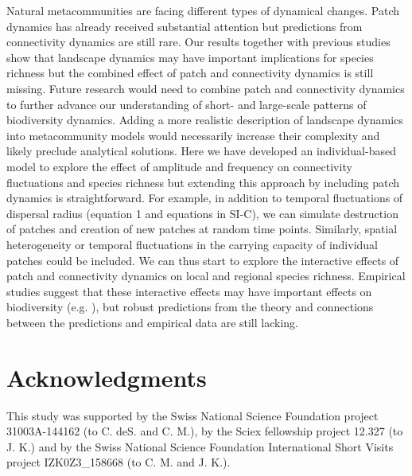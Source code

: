 \documentclass[12pt]{article}
\begin{document}
Natural metacommunities are facing different types of dynamical changes. Patch dynamics has already received substantial attention but predictions from connectivity dynamics are still rare. Our results together with previous studies show that landscape dynamics may have important implications for species richness but the combined effect of patch and connectivity dynamics is still missing. Future research would need to combine patch and connectivity dynamics to further advance our understanding of short- and large-scale patterns of biodiversity dynamics. Adding a more realistic description of landscape dynamics into metacommunity models would necessarily increase their complexity and likely preclude analytical solutions. Here we have developed an individual-based model to explore the effect of amplitude and frequency on connectivity fluctuations and species richness but extending this approach by including patch dynamics is straightforward. For example, in addition to temporal fluctuations of dispersal radius (equation 1 and equations in SI-C), we can simulate destruction of patches and creation of new patches at random time points. Similarly, spatial heterogeneity or temporal fluctuations in the carrying capacity of individual patches could be included. We can thus start to explore the interactive effects of patch and connectivity dynamics on local and regional species richness. Empirical studies suggest that these interactive effects may have important effects on biodiversity (e.g. \cite{LauranceEtAl1997, RoshierEtAl2008, MetzgerEtAl2009, RuizEtAl2014}), but robust predictions from the theory and connections between the predictions and empirical data are still lacking. 

\section*{Acknowledgments}

This study was supported by the Swiss National Science Foundation
project 31003A-144162 (to C. deS. and C. M.), by the Sciex fellowship
project 12.327 (to J. K.) and by the Swiss National Science Foundation International Short Visits project IZK0Z3\_158668 (to C. M. and J. K.).

\newpage


\end{document}
